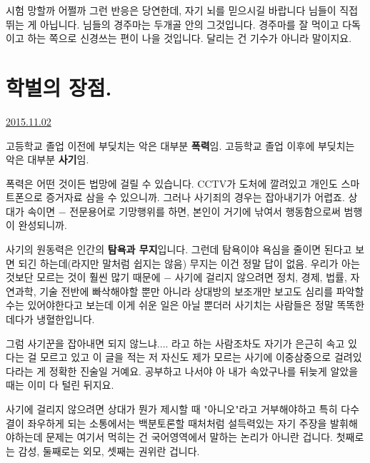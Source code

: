 시험 망할까 어쩔까 그런 반응은 당연한데, 자기 뇌를 믿으시길 바랍니다
님들이 직접 뛰는 게 아닙니다. 님들의 경주마는 두개골 안의 그것입니다.
경주마를 잘 먹이고 다독이고 하는 쪽으로 신경쓰는 편이 나을 것입니다. 달리는 건 기수가 아니라 말이지요.
\vspace{5mm}






\section{학벌의 장점.}
\href{https://www.kockoc.com/Apoc/460316}{2015.11.02}

\vspace{5mm}

고등학교 졸업 이전에 부딪치는 악은 대부분 \textbf{폭력}임.
고등학교 졸업 이후에 부딪치는 악은 대부분 \textbf{사기}임.
\vspace{5mm}

폭력은 어떤 것이든 법망에 걸릴 수 있습니다. CCTV가 도처에 깔려있고 개인도 스마트폰으로 증거자료 삼을 수 있으니까.
그러나 사기죄의 경우는 잡아내기가 어렵죠. 상대가 속이면 $-$ 전문용어로 기망행위를 하면, 본인이 거기에 낚여서 행동함으로써 범행이 완성되니까.
\vspace{5mm}

사기의 원동력은 인간의 \textbf{탐욕과 무지}입니다.
그런데 탐욕이야 욕심을 줄이면 된다고 보면 되긴 하는데(라지만 말처럼 쉽지는 않음)
무지는 이건 정말 답이 없음. 우리가 아는 것보단 모르는 것이 훨씬 많기 때문에 $-$
사기에 걸리지 않으려면 정치, 경제, 법률, 자연과학, 기술 전반에 빠삭해야할 뿐만 아니라
상대방의 보조개만 보고도 심리를 파악할 수는 있어야한다고 보는데 이게 쉬운 일은 아닐 뿐더러
사기치는 사람들은 정말 똑똑한 데다가 냉혈한입니다.
\vspace{5mm}

그럼 사기꾼을 잡아내면 되지 않느냐.... 라고 하는 사람조차도 자기가 은근히 속고 있다는 걸 모르고 있고
이 글을 적는 저 자신도 제가 모르는 사기에 이중삼중으로 걸려있다라는 게 정확한 진술일 거예요.
공부하고 나서야 아 내가 속았구나를 뒤늦게 알았을 때는 이미 다 털린 뒤지요.
\vspace{5mm}

사기에 걸리지 않으려면 상대가 뭔가 제시할 때 "아니오"라고 거부해야하고
특히 다수결이 좌우하게 되는 소통에서는 백분토론할 때처처럼 설득력있는 자기 주장을 발휘해야하는데
문제는 여기서 먹히는 건 국어영역에서 말하는 논리가 아니란 겁니다. 첫째로는 감성, 둘째로는 외모, 셋째는 권위란 겁니다.
\vspace{5mm}

